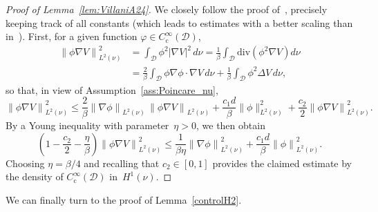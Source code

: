 \documentclass[AHL,Unicode,longabstracts,MathTools,published]{cedram}
\newcommand{\rmc}{\mathrm{c}}
\newcommand{\divl}{\mathrm{div}}
\newcommand{\cD}{\mathcal{D}}
\renewcommand{\leq}{\leqslant}
\begin{document}
\begin{proof}[Proof of Lemma~\ref{lem:VillaniA24}]
We closely follow the proof of~\cite[Lemma~A.24]{Villani09}, precisely keeping track of all constants (which leads to estimates with a better scaling than in~\cite[Lemma~2.2]{CLW19}). First, for a given function $\varphi \in C_\rmc^\infty(\cD)$,
\begin{align*}
\left\|\phi \nabla V \right\|^2_{L^2(\nu)} & = \int_\cD \phi^2 |\nabla V|^2 \, d\nu = \frac1\beta \int_\cD \divl\left(\phi^2 \nabla V\right) d\nu \\
& = \frac{2}{\beta} \int_\cD \phi \nabla \phi \cdot \nabla V \, d\nu + \frac{1}{\beta}\int_\cD \phi^2 \Delta V \, d\nu,
\end{align*}
so that, in view of Assumption~\ref{ass:Poincare_nu},
\[
\left\| \phi \nabla V\right\|^2_{L^2(\nu)} \leq \frac{2}{\beta} \left\|\nabla \phi\right\|_{L^2(\nu)} \, \left\| \phi \nabla V\right\|_{L^2(\nu)} + \frac{c_1 d}{\beta} \| \phi\|_{L^2(\nu)}^2 + \frac{c_2}{2} \left\|\phi \nabla V\right\|_{L^2(\nu)}^2.
\]
By a Young inequality with parameter~$\eta>0$, we then obtain
\[
\left(1-\frac{c_2}{2}-\frac{\eta}{\beta}\right)\left\| \phi \nabla V\right\|^2_{L^2(\nu)} \leq \frac{1}{\beta \eta} \left\|\nabla \phi\right\|^2_{L^2(\nu)} + \frac{c_1 d}{\beta} \left\| \phi \right\|_{L^2(\nu)}^2.
\]
Choosing $\eta = \beta/4$ and recalling that $c_2 \in [0,1]$ provides the claimed estimate by the density of $C_\rmc^\infty(\cD)$ in~$H^1(\nu)$.
\end{proof}

We can finally turn to the proof of Lemma~\ref{controlH2}.
\end{document}
